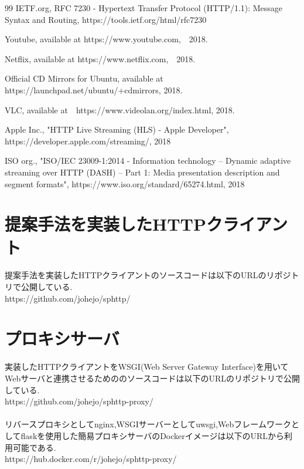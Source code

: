 \documentclass[a4j,12pt]{gradthesis_utf8}
\begin{document}
\begin{flushleft}
\begin {thebibliography}{99}
IETF.org, RFC 7230 - Hypertext Transfer Protocol (HTTP/1.1): Message Syntax and Routing, https://tools.ietf.org/html/rfc7230

Youtube, available at https://www.youtube.com,　2018.

Netflix, available at https://www.netflix.com,　2018.

Official CD Mirrors for Ubuntu, available at https://launchpad.net/ubuntu/+cdmirrors, 2018.

VLC, available at　https://www.videolan.org/index.html, 2018.

Apple Inc., "HTTP Live Streaming (HLS) - Apple Developer",  https://developer.apple.com/streaming/, 2018

ISO org., "ISO/IEC 23009-1:2014 - Information technology -- Dynamic adaptive streaming over HTTP (DASH) -- Part 1: Media presentation description and segment formats", https://www.iso.org/standard/65274.html, 2018
\end {thebibliography}
\end{flushleft}

\begin{appendix}
	\label{appendix}
	\chapter{提案手法を実装したHTTPクライアント}
	提案手法を実装したHTTPクライアントのソースコードは以下のURLのリポジトリで公開している.\\
	https://github.com/johejo/sphttp/
	
	\chapter{プロキシサーバ}
	\label{sphttp-proxy}
	実装したHTTPクライアントをWSGI(Web Server Gateway Interface)を用いてWebサーバと連携させるためののソースコードは以下のURLのリポジトリで公開している.\\
	https://github.com/johejo/sphttp-proxy/ \\ \\
	リバースプロキシとしてnginx,WSGIサーバーとしてuwsgi,Webフレームワークとしてflaskを使用した簡易プロキシサーバのDockerイメージは以下のURLから利用可能である.\\
	https://hub.docker.com/r/johejo/sphttp-proxy/ \\
	
\end{appendix}
\end{document}
